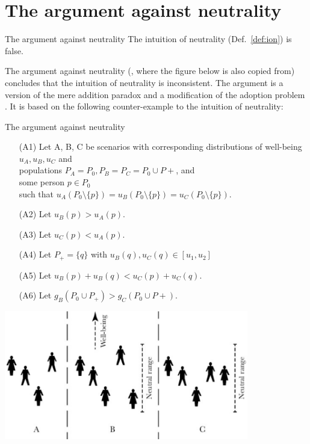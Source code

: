 \section{The argument against neutrality}

\begin{Theorem}{The argument against neutrality}{}
The intuition of neutrality (Def.~\ref{def:ion}) is false.
\end{Theorem}

The argument against neutrality (, where the figure below is also copied from) concludes that the intuition of neutrality is inconsistent. The argument is a version of the mere addition paradox \cite[p.~148]{broome_2004} and a modification of the adoption problem \cite[p.~161]{broome_2004}. It is based on the following counter-example to the intuition of neutrality:  

\begin{Counterexample}{The argument against neutrality}{}
\begin{enumerate}
\item[(A1)]
Let A, B, C be scenarios with  
corresponding distributions of well-being $u_A, u_B, u_C$ and \\
populations $P_A = P_0, P_B = P_C = P_0 \cup P+$, and \\
some person $p \in P_0$ \\
such that $u_A(P_0 \setminus \{p\}) = u_B(P_0 \setminus \{p\}) = u_C(P_0 \setminus \{p\}).$
\item[(A2)] Let $u_B(p) > u_A(p).$
\item[(A3)] Let $u_C(p) < u_A(p).$
\item[(A4)] Let $P_+ = \{q\}$ with $u_B(q), u_C(q) \in [u_1, u_2]$
\item[(A5)] Let $u_B(p) + u_B(q) < u_C(p) + u_C(q).$
\item[(A6)] Let $g_B(P_0 \cup P_+) > g_C(P_0 \cup P+)$. 
\end{enumerate}
\begin{center}
  \includegraphics[width=0.8\textwidth]{3-fig-1}
\end{center}
\end{Counterexample}

